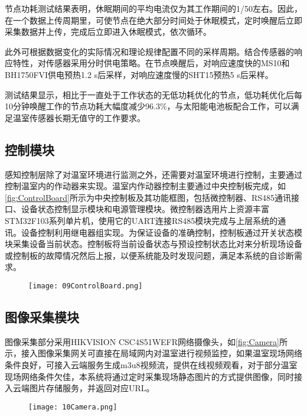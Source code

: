 节点功耗测试结果表明，休眠期间的平均电流仅为其工作期间的1/50左右。因此，在一个数据上传周期里，可使节点在绝大部分时间处于休眠模式，定时唤醒后立即采集数据并上传，完成后立即进入休眠模式，依次循环。

此外可根据数据变化的实际情况和理论规律配置不同的采样周期。结合传感器的响应特性，对传感器采用分时供电策略。在节点唤醒后，对响应速度快的MS10和BH1750FVI供电预热1.2 s后采样，对响应速度慢的SHT15预热5 s后采样。

测试结果显示，相比于一直处于工作状态的无低功耗优化的节点，低功耗优化后每10分钟唤醒工作的节点功耗大幅度减少96.3\%，与太阳能电池板配合工作，可以满足温室传感器长期无值守的工作要求。

	\subsection{控制模块}
	感知控制层除了对温室环境进行监测之外，还需要对温室环境进行控制，主要通过控制温室内的作动器来实现。温室内作动器控制主要通过中央控制板完成，如\ref{fig:ControlBoard}所示为中央控制板及其功能框图，包括微控制器、RS485通讯接口、设备状态控制显示模块和电源管理模块。微控制器选用片上资源丰富STM32F103系列单片机，使用它的UART连接RS485模块完成与上层系统的通讯。设备控制利用继电器组实现。为保证设备的准确控制，控制板通过开关状态模块采集设备当前状态。控制板将当前设备状态与预设控制状态比对来分析现场设备或控制板的故障情况然后上报，以便系统能及时发现问题，满足本系统的自诊断需求。
	\begin{figure}[!htp]
		\centering
		\texttt{[image: 09ControlBoard.png]}
	\end{figure}
	\subsection{图像采集模块}
图像采集部分采用HIKVISION CSC4S51WEFR网络摄像头，如\ref{fig:Camera}所示，接入图像采集网关可直接在局域网内对温室进行视频监控，如果温室现场网络条件良好，可接入云端服务生成m3u8视频流，提供在线视频观看，对于部分温室现场网络条件欠佳，本系统将通过定时采集现场静态图片的方式提供图像，同时接入云端图片存储服务，并返回对应URL。
	\begin{figure}[!htp]
		\centering
		\texttt{[image: 10Camera.png]}
	\end{figure}
